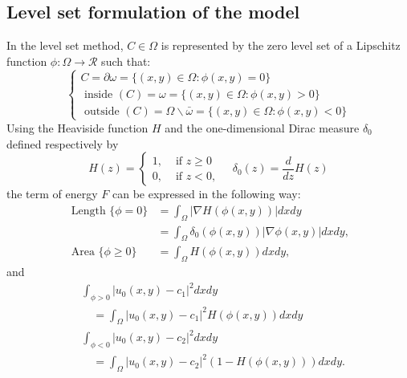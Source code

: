 \documentclass[journal]{IEEEtran}
\begin{document}
\subsection{Level set formulation of the model}
In the level set method\cite{ne19}, $C\in\Omega$ is represented by the zero level set of a Lipschitz function $\phi:\Omega\to\mathcal{R}$ such that:
\begin{equation}
  \left\{\begin{array}{l}
  C=\partial \omega=\{(x, y) \in \Omega: \phi(x, y)=0\} \\
  \text { inside }(C)=\omega=\{(x, y) \in \Omega: \phi(x, y)>0\} \\
  \text { outside }(C)=\Omega \backslash \bar{\omega}=\{(x, y) \in \Omega: \phi(x, y)<0\}
  \end{array}\right.
\end{equation}
Using the Heaviside function $H$ and the one-dimensional Dirac measure $\delta_0$ defined respectively by
\begin{equation}
  H(z)=\left\{\begin{array}{ll}
  1, & \text { if } z \geq 0 \\
  0, & \text { if } z<0,
  \end{array} \quad \delta_{0}(z)=\frac{d}{d z} H(z)\right.
\end{equation}
the term of energy $F$ can be expressed in the following way:
\begin{equation}
  \begin{aligned}
  \text { Length }\{\phi=0\} &=\int_{\Omega}|\nabla H(\phi(x, y))| d x d y \\
  &=\int_{\Omega} \delta_{0}(\phi(x, y))|\nabla \phi(x, y)| d x d y, \\
  \text { Area }\{\phi \geq 0\} &=\int_{\Omega} H(\phi(x, y)) d x d y,
  \end{aligned}
\end{equation}
and
\begin{equation}
  \begin{aligned}
  &\int_{\phi>0}\left|u_{0}(x, y)-c_{1}\right|^{2} d x d y \\
  &\quad=\int_{\Omega}\left|u_{0}(x, y)-c_{1}\right|^{2} H(\phi(x, y)) d x d y \\
  &\int_{\phi<0}\left|u_{0}(x, y)-c_{2}\right|^{2} d x d y \\
  &\quad=\int_{\Omega}\left|u_{0}(x, y)-c_{2}\right|^{2}(1-H(\phi(x, y))) d x d y .
  \end{aligned}
\end{equation}
\end{document}
